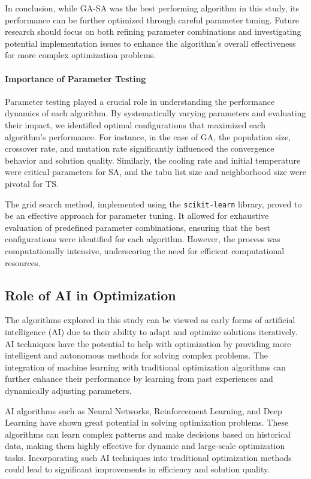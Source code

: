 \documentclass{article}
\begin{document}
    In conclusion, while GA-SA was the best performing algorithm in this study, its performance can be further optimized through careful parameter tuning. Future research should focus on both refining parameter combinations and investigating potential implementation issues to enhance the algorithm’s overall effectiveness for more complex optimization problems.

    \paragraph{Importance of Parameter Testing}
    Parameter testing played a crucial role in understanding the performance dynamics of each algorithm. By systematically varying parameters and evaluating their impact, we identified optimal configurations that maximized each algorithm's performance. For instance, in the case of GA, the population size, crossover rate, and mutation rate significantly influenced the convergence behavior and solution quality. Similarly, the cooling rate and initial temperature were critical parameters for SA, and the tabu list size and neighborhood size were pivotal for TS.

    The grid search method, implemented using the \texttt{scikit-learn} library, proved to be an effective approach for parameter tuning. It allowed for exhaustive evaluation of predefined parameter combinations, ensuring that the best configurations were identified for each algorithm. However, the process was computationally intensive, underscoring the need for efficient computational resources.

    \subsection{Role of AI in Optimization}
    The algorithms explored in this study can be viewed as early forms of artificial intelligence (AI) due to their ability to adapt and optimize solutions iteratively. AI techniques have the potential to help with optimization by providing more intelligent and autonomous methods for solving complex problems. The integration of machine learning with traditional optimization algorithms can further enhance their performance by learning from past experiences and dynamically adjusting parameters.

    AI algorithms such as Neural Networks, Reinforcement Learning, and Deep Learning have shown great potential in solving optimization problems. These algorithms can learn complex patterns and make decisions based on historical data, making them highly effective for dynamic and large-scale optimization tasks. Incorporating such AI techniques into traditional optimization methods could lead to significant improvements in efficiency and solution quality. \cite{Peng2020}
\end{document}
